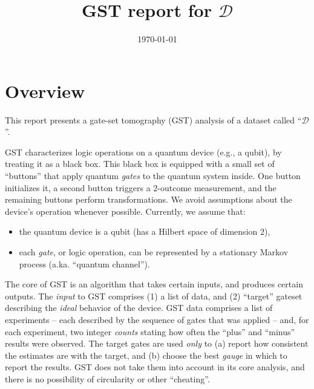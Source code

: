 \documentclass{article}[11pt]
\begin{document}
\title{GST report for $\mathcal{D}$}
\date{\vspace{-1cm}\today}

\begingroup
\let\center\flushleft
\let\endcenter\endflushleft
\maketitle
\endgroup

\section{Overview}
This report presents a gate-set tomography (GST) analysis of a dataset called ``$\mathcal{D}$''.  

GST characterizes logic operations on a quantum device (e.g., a qubit), by treating it as a black box.  This black box is equipped with a small set of ``buttons'' that apply quantum \emph{gates} to the quantum system inside.  One button initializes it, a second button triggers a 2-outcome measurement, and the remaining buttons perform transformations.  We avoid assumptions about the device's operation whenever possible.  Currently, we assume that:
\begin{itemize}
\item the quantum device is a qubit (has a Hilbert space of dimension 2),
\item each \emph{gate}, or logic operation, can be represented by a stationary Markov process (a.ka. ``quantum channel'').
\end{itemize}
The core of GST is an algorithm that takes certain inputs, and produces certain outputs.  The \emph{input} to GST comprises (1) a list of data, and (2) ``target'' gateset describing the \emph{ideal} behavior of the device.  GST data comprises a list of experiments -- each described by the sequence of gates that was applied -- and, for each experiment, two integer \emph{counts} stating how often the ``plus'' and ``minus'' results were observed.  The target gates are used \emph{only} to (a) report how consistent the estimates are with the target, and (b) choose the best \emph{gauge} in which to report the results.  GST does not take them into account in its core analysis, and there is no possibility of circularity or other ``cheating''.
\end{document}
